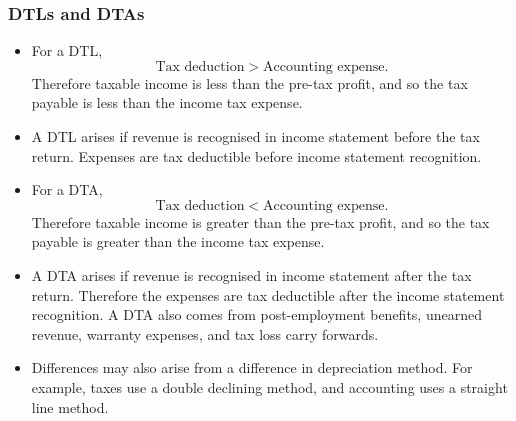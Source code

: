 \documentclass[../notes_compiled.tex]{subfiles}
\begin{document}
\subsubsection{DTLs and DTAs}
\begin{itemize}
\item For a DTL,
\begin{equation*}
\text{Tax deduction} > \text{Accounting expense}.
\end{equation*}
Therefore taxable income is less than the pre-tax profit, and so the tax payable is less than the income tax expense.
\item A DTL arises if revenue is recognised in income statement before the tax return. Expenses are tax deductible before income statement recognition.
\item For a DTA,
\begin{equation*}
\text{Tax deduction} < \text{Accounting expense}.
\end{equation*}
Therefore taxable income is greater than the pre-tax profit, and so the tax payable is greater than the income tax expense.
\item A DTA arises if revenue is recognised in income statement after the tax return. Therefore the expenses are tax deductible after the income statement recognition. A DTA also comes from post-employment benefits, unearned revenue, warranty expenses, and tax loss carry forwards.
\item Differences may also arise from a difference in depreciation method. For example, taxes use a double declining method, and accounting uses a straight line method.
\end{itemize}
\end{document}
